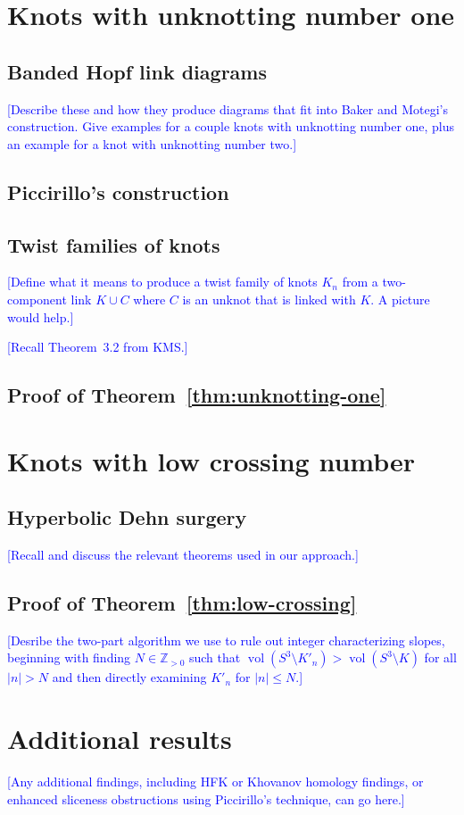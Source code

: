 \documentclass[11pt,usenames,dvipsnames,reqno]{amsart}
\newcommand{\zz}{\mathbb{Z}}
\newcommand{\vol}{\operatorname{vol}}
\numberwithin{theorem}{section}
\theoremstyle{ex}
\theoremstyle{rem}
\def\kh#1{\textcolor{Blue}{#1}}
\begin{document}
\section{Knots with unknotting number one}\label{sec:unknotting-one}

\subsection{Banded Hopf link diagrams} \kh{[Describe these and how they produce diagrams that fit into Baker and Motegi's construction. Give examples for a couple knots with unknotting number one, plus an example for a knot with unknotting number two.]}

\subsection{Piccirillo's construction}

\subsection{Twist families of knots}

\kh{[Define what it means to produce a twist family of knots $K_n$ from a two-component link $K\cup C$ where $C$ is an unknot that is linked with $K$. A picture would help.]}

\kh{[Recall Theorem~3.2 from KMS.]}

\subsection{Proof of Theorem~\ref{thm:unknotting-one}}

\section{Knots with low crossing number}


\subsection{Hyperbolic Dehn surgery} \kh{[Recall and discuss the relevant theorems used in our approach.]}

\subsection{Proof of Theorem~\ref{thm:low-crossing}}

\kh{[Desribe the two-part algorithm we use to rule out integer characterizing slopes, beginning with finding $N \in \zz_{>0}$ such that $\vol(S^3 \setminus K'_n)> \vol(S^3 \setminus K)$ for all $|n|>N$ and then directly examining $K'_n$ for $|n| \leq N$.]}

\section{Additional results}

\kh{[Any additional findings, including HFK or Khovanov homology findings, or enhanced sliceness obstructions using Piccirillo's technique, can go here.]}




\end{document}
